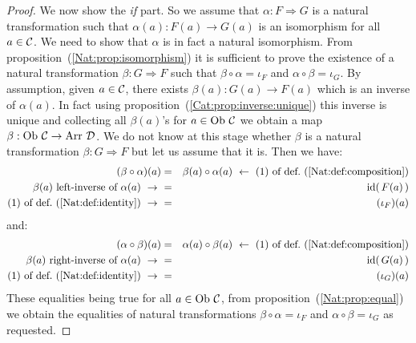\begin{proof}
    We now show the {\em if} part. So we assume that $\alpha:F\Rightarrow G$
    is a natural transformation such that $\alpha(a):F(a)\to G(a)$ is an
    isomorphism for all $a\in\mbox{$\cal C$}$. We need to show that $\alpha$ is in
    fact a natural isomorphism. From proposition~(\ref{Nat:prop:isomorphism})
    it is sufficient to prove the existence of a natural transformation
    $\beta:G\Rightarrow F$ such that $\beta\circ\alpha=\iota_{F}$ and 
    $\alpha\circ\beta=\iota_{G}$. By assumption, given $a\in\mbox{$\cal C$}$, there 
    exists $\beta(a):G(a)\to F(a)$ which is an inverse of $\alpha(a)$. In 
    fact using proposition~(\ref{Cat:prop:inverse:unique}) this inverse is 
    unique and collecting all $\beta(a)$'s for $a\in\mbox{\rm Ob}\ \mbox{$\cal C$}$ we obtain a map
    $\beta:\mbox{\rm Ob}\ \mbox{$\cal C$}\to\mbox{\rm Arr}\ \mbox{$\cal D$}$. We do not know at this stage whether
    $\beta$ is a natural transformation $\beta:G\Rightarrow F$ but let us
    assume that it is. Then we have:
        \begin{eqnarray*}(\beta\circ\alpha)(a)
            &=&\beta(a)\circ\alpha(a)\ \leftarrow\ 
            \mbox{$(1)$ of def.~(\ref{Nat:def:composition})}\\
            \mbox{$\beta(a)$ left-inverse of $\alpha(a)$}\ \to\ 
            &=&\id(\,F(a)\,)\\
            \mbox{$(1)$ of def.~(\ref{Nat:def:identity})}\ \to\ 
            &=&(\iota_{F})(a)
        \end{eqnarray*}
    and:
        \begin{eqnarray*}(\alpha\circ\beta)(a)
            &=&\alpha(a)\circ\beta(a)\ \leftarrow\ 
            \mbox{$(1)$ of def.~(\ref{Nat:def:composition})}\\
            \mbox{$\beta(a)$ right-inverse of $\alpha(a)$}\ \to\ 
            &=&\id(\,G(a)\,) \\
            \mbox{$(1)$ of def.~(\ref{Nat:def:identity})}\ \to\ 
            &=&(\iota_{G})(a)
        \end{eqnarray*}
    These equalities being true for all $a\in\mbox{\rm Ob}\ \mbox{$\cal C$}$, from 
    proposition~(\ref{Nat:prop:equal}) we obtain the equalities
    of natural transformations $\beta\circ\alpha=\iota_{F}$ and
    $\alpha\circ\beta=\iota_{G}$ as requested.


\end{proof}
